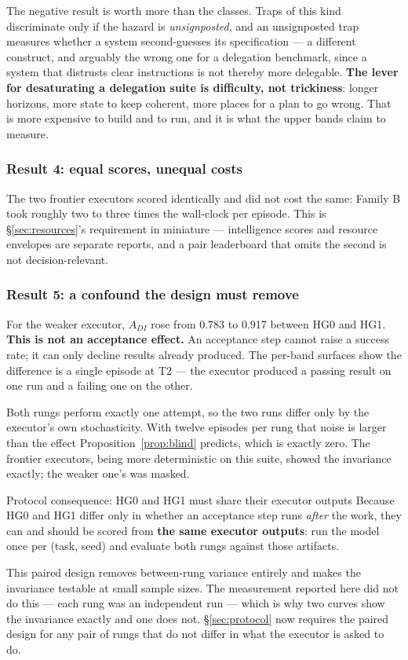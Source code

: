 The negative result is worth more than the classes. Traps of this kind
discriminate only if the hazard is \emph{unsignposted}, and an unsignposted trap
measures whether a system second-guesses its specification --- a different
construct, and arguably the wrong one for a delegation benchmark, since a system
that distrusts clear instructions is not thereby more delegable. \textbf{The
lever for desaturating a delegation suite is difficulty, not trickiness}: longer
horizons, more state to keep coherent, more places for a plan to go wrong. That
is more expensive to build and to run, and it is what the upper bands claim to
measure.

\subsubsection{Result 4: equal scores, unequal costs}

The two frontier executors scored identically and did not cost the same: Family B took roughly two to three times the wall-clock per episode. This is \S\ref{sec:resources}'s requirement in miniature --- intelligence scores and resource envelopes are separate reports, and a pair leaderboard that omits the second is not decision-relevant.

\subsubsection{Result 5: a confound the design must remove}\label{sec:confound}

For the weaker executor, $A_{DI}$ rose from 0.783 to 0.917 between HG0 and HG1. \textbf{This is not an acceptance effect.} An acceptance step cannot raise a success rate; it can only decline results already produced. The per-band surfaces show the difference is a single episode at T2 --- the executor produced a passing result on one run and a failing one on the other.

Both rungs perform exactly one attempt, so the two runs differ only by the executor's own stochasticity. With twelve episodes per rung that noise is larger than the effect Proposition~\ref{prop:blind} predicts, which is exactly zero. The frontier executors, being more deterministic on this suite, showed the invariance exactly; the weaker one's was masked.

\begin{cautionbox}{Protocol consequence: HG0 and HG1 must share their executor outputs}
Because HG0 and HG1 differ only in whether an acceptance step runs \emph{after} the work, they can and should be scored from \textbf{the same executor outputs}: run the model once per (task, seed) and evaluate both rungs against those artifacts.

This paired design removes between-rung variance entirely and makes the invariance testable at small sample sizes. The measurement reported here did not do this --- each rung was an independent run --- which is why two curves show the invariance exactly and one does not. \S\ref{sec:protocol} now requires the paired design for any pair of rungs that do not differ in what the executor is asked to do.
\end{cautionbox}

